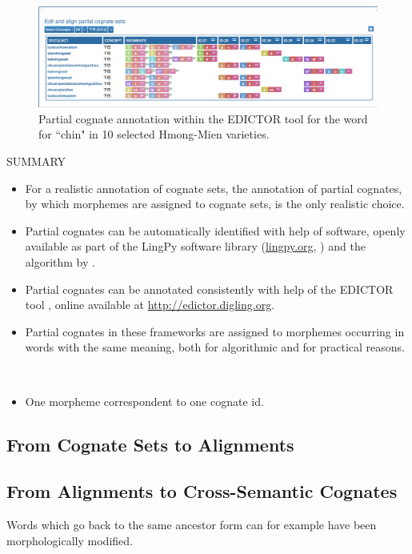 \documentclass[xetex,svgnames]{scrartcl}
\begin{document}
\begin{figure}
  \centering
  \includegraphics[width=\textwidth]{partial-cognates.png}
  \caption{Partial cognate annotation within the EDICTOR tool for the word for ``chin" in 10
  selected Hmong-Mien varieties.}
  \label{fig:edipart}
\end{figure}

\begin{center}
  \hline
  SUMMARY \\\hline
  \begin{itemize}
    \item For a realistic annotation of cognate sets, the annotation of partial cognates, by which
      morphemes are assigned to cognate sets, is the only realistic choice.
    \item Partial cognates can be automatically identified with help of software, openly available
      as part of the LingPy software library (\url{lingpy.org}, \citealt{List2018i}) and the
      algorithm by \citet{List2016g}.
    \item Partial cognates can be annotated consistently with help of the EDICTOR tool
      \citep{List2017d}, online available at \url{http://edictor.digling.org}.
    \item Partial cognates in these frameworks are assigned to morphemes occurring in words with the
      same meaning, both for algorithmic and for practical reasons.
  \end{itemize}\\\hline
  \endtabular
\end{center}


\begin{itemize}
\item One morpheme correspondent to one cognate id.
\end{itemize}


\subsection{From Cognate Sets to Alignments}

\subsection{From Alignments to Cross-Semantic Cognates}
Words which go back to the same ancestor form can for example have been morphologically modified.
\end{document}
